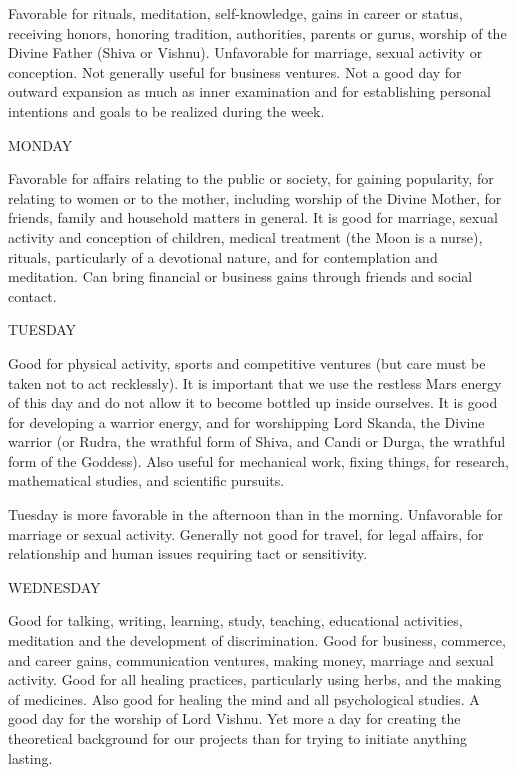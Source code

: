 \begin{enumerate}
Favorable for rituals, meditation, self-knowledge, gains in career or status, receiving honors, honoring tradition, authorities, parents or gurus, worship of the Divine Father (Shiva or Vishnu). Unfavorable for marriage, sexual activity or conception. Not generally useful for business ventures. Not a good day for outward expansion as much as inner examination and for establishing personal intentions and goals to be realized during the week.

 

MONDAY

Favorable for affairs relating to the public or society, for gaining popularity, for relating to women or to the mother, including worship of the Divine Mother, for friends, family and household matters in general. It is good for marriage, sexual activity and conception of children, medical treatment (the Moon is a nurse), rituals, particularly of a devotional nature, and for contemplation and meditation. Can bring financial or business gains through friends and social contact.

 

TUESDAY

Good for physical activity, sports and competitive ventures (but care must be taken not to act recklessly). It is important that we use the restless Mars energy of this day and do not allow it to become bottled up inside ourselves. It is good for developing a warrior energy, and for worshipping Lord Skanda, the Divine warrior (or Rudra, the wrathful form of Shiva, and Candi or Durga, the wrathful form of the Goddess). Also useful for mechanical work, fixing things, for research, mathematical studies, and scientific pursuits.

Tuesday is more favorable in the afternoon than in the morning. Unfavorable for marriage or sexual activity. Generally not good for travel, for legal affairs, for relationship and human issues requiring tact or sensitivity.

 

WEDNESDAY

Good for talking, writing, learning, study, teaching, educational activities, meditation and the development of discrimination. Good for business, commerce, and career gains, communication ventures, making money, marriage and sexual activity. Good for all healing practices, particularly using herbs, and the making of medicines. Also good for healing the mind and all psychological studies. A good day for the worship of Lord Vishnu. Yet more a day for creating the theoretical background for our projects than for trying to initiate anything lasting.


\end{enumerate}
